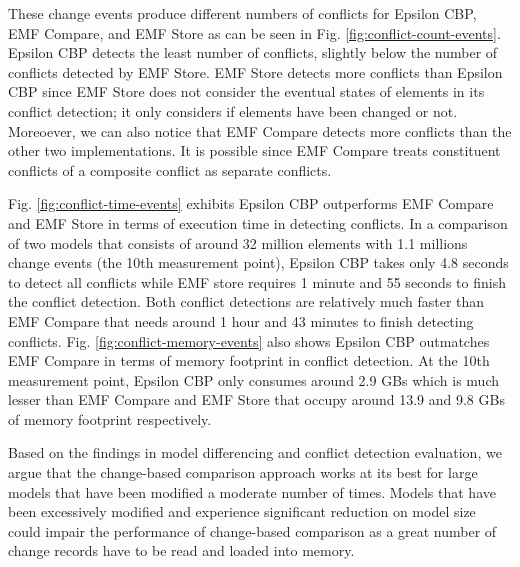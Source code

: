These change events produce different numbers of conflicts for Epsilon CBP, EMF Compare, and EMF Store as can be seen in Fig. \ref{fig:conflict-count-events}. Epsilon CBP detects the least number of conflicts, slightly below the number of conflicts detected by EMF Store. EMF Store detects more conflicts than Epsilon CBP since EMF Store does not consider the eventual states of elements in its conflict detection; it only considers if elements have been changed or not. Moreoever, we can also notice that EMF Compare detects more conflicts than the other two implementations. It is possible since EMF Compare treats constituent conflicts of a composite conflict as separate conflicts. 

Fig. \ref{fig:conflict-time-events} exhibits Epsilon CBP outperforms EMF Compare and EMF Store in terms of execution time in detecting conflicts. In a comparison of two models that consists of around 32 million elements with 1.1 millions change events (the 10th measurement point), Epsilon CBP takes only 4.8 seconds to detect all conflicts while EMF store requires 1 minute and 55 seconds to finish the conflict detection. Both conflict detections are relatively much faster than EMF Compare that needs around 1 hour and 43 minutes to finish detecting conflicts. Fig. \ref{fig:conflict-memory-events} also shows Epsilon CBP outmatches EMF Compare in terms of memory footprint in conflict detection. At the 10th measurement point, Epsilon CBP only consumes around 2.9 GBs which is much lesser than EMF Compare and EMF Store that occupy around 13.9 and 9.8 GBs of memory footprint respectively.

Based on the findings in model differencing and conflict detection evaluation, we argue that the change-based comparison approach works at its best for large models that have been modified a moderate number of times. Models that have been excessively modified and experience significant reduction on model size could impair the performance of change-based comparison as a great number of change records have to be read and loaded into memory. 

